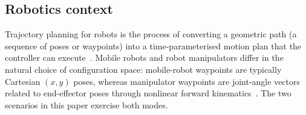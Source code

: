 \subsection{Robotics context}

Trajectory planning for robots is the process of converting a
geometric path (a sequence of poses or waypoints) into a
time-parameterised motion plan that the controller can
execute~\cite{biagiotti2008, siciliano2009}. Mobile robots and robot
manipulators differ in the natural choice of configuration space:
mobile-robot waypoints are typically Cartesian $(x, y)$ poses,
whereas manipulator waypoints are joint-angle vectors related to
end-effector poses through nonlinear forward
kinematics~\cite{craig2018}. The two scenarios in this paper
exercise both modes.
